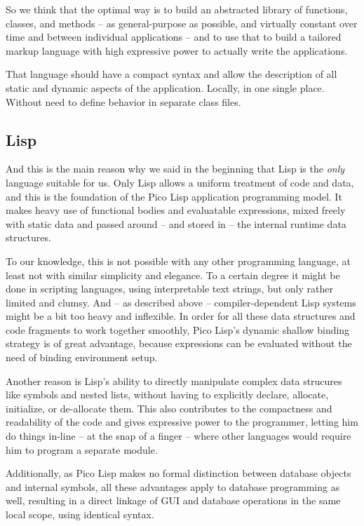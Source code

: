 So we think that the optimal way is to build an abstracted library of functions,
classes, and methods -- as general-purpose as possible, and virtually constant
over time and between individual applications -- and to use that to build a
tailored markup language with high expressive power to actually write the
applications.

That language should have a compact syntax and allow the description of all
static and dynamic aspects of the application. Locally, in one single place.
Without need to define behavior in separate class files.


\subsection{Lisp}
\label{sec:rad-lisp}

And this is the main reason why we said in the beginning that Lisp is the
\emph{only} language suitable for us. Only Lisp allows a uniform treatment of
code and data, and this is the foundation of the Pico Lisp application
programming model. It makes heavy use of functional bodies and evaluatable
expressions, mixed freely with static data and passed around -- and stored in --
the internal runtime data structures.

To our knowledge, this is not possible with any other programming language, at
least not with similar simplicity and elegance. To a certain degree it might be
done in scripting languages, using interpretable text strings, but only rather
limited and clumsy. And -- as described above -- compiler-dependent Lisp systems
might be a bit too heavy and inflexible. In order for all these data structures
and code fragments to work together smoothly, Pico Lisp's dynamic shallow
binding strategy is of great advantage, because expressions can be evaluated
without the need of binding environment setup.

Another reason is Lisp's ability to directly manipulate complex data strucures
like symbols and nested lists, without having to explicitly declare, allocate,
initialize, or de-allocate them. This also contributes to the compactness and
readability of the code and gives expressive power to the programmer, letting
him do things in-line -- at the snap of a finger -- where other languages would
require him to program a separate module.

Additionally, as Pico Lisp makes no formal distinction between database objects
and internal symbols, all these advantages apply to database programming as
well, resulting in a direct linkage of GUI and database operations in the same
local scope, using identical syntax.


